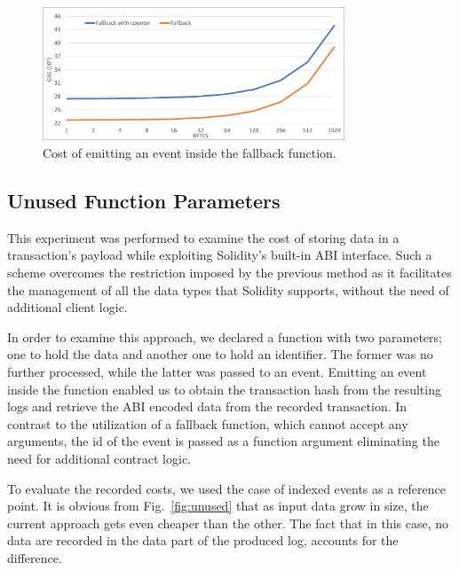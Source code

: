 \begin{figure}[htbp]
\centerline{\includegraphics[width=9cm]{figs/fallback.pdf}}
\caption{Cost of emitting an event inside the fallback function.}
\label{fig:fallback}
\end{figure}

\subsection{Unused Function Parameters}\label{subsection:evaluation_unused}
This experiment was performed to examine the cost of storing data in a transaction’s payload while exploiting Solidity’s built-in ABI interface.
Such a scheme overcomes the restriction imposed by the previous method as it facilitates the management of all the data types that Solidity supports, without the need of additional client logic. 

In order to examine this approach, we declared a function with two parameters; one to hold the data and another one to hold an identifier. The former was no further processed, while the latter was passed to an event. Emitting an event inside the function enabled us to obtain the transaction hash from the resulting logs and retrieve the ABI encoded data from the recorded transaction. In contrast to the utilization of a fallback function, which cannot accept any arguments, the id of the event is passed as a function argument eliminating the need for additional contract logic.

To evaluate the recorded costs, we used the case of indexed events as a reference point. It is obvious from Fig.~\ref{fig:unused} that as input data grow in size, the current approach gets even cheaper than the other. The fact that in this case, no data are recorded in the data part of the produced log, accounts for the difference.


